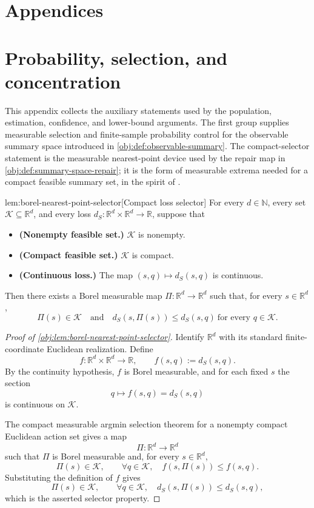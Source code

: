 \documentclass[11pt]{article}
\begin{document}
\appendix

\section*{Appendices}

\section{Probability, selection, and concentration}

This appendix collects the auxiliary statements used by the population, estimation, confidence, and lower-bound arguments. The first group supplies measurable selection and finite-sample probability control for the observable summary space introduced in \cref{obj:def:observable-summary}. The compact-selector statement is the measurable nearest-point device used by the repair map in \cref{obj:def:summary-space-repair}; it is the form of measurable extrema needed for a compact feasible summary set, in the spirit of \citet{BrownPurves1973}.

\begin{lemmav}{lem:borel-nearest-point-selector}[Compact loss selector]
For every \(d\in\mathbb N\), every set \(\mathcal K\subseteq \mathbb R^d\), and every loss \(d_S:\mathbb R^d\times\mathbb R^d\to\mathbb R\), suppose that
\begin{itemize}
\item \textbf{(Nonempty feasible set.)} \(\mathcal K\) is nonempty.
\item \textbf{(Compact feasible set.)} \(\mathcal K\) is compact.
\item \textbf{(Continuous loss.)} The map \((s,q)\mapsto d_S(s,q)\) is continuous.
\end{itemize}
Then there exists a Borel measurable map \(\Pi:\mathbb R^d\to\mathbb R^d\) such that, for every \(s\in\mathbb R^d\),
\[
\Pi(s)\in\mathcal K
\quad\text{and}\quad
d_S(s,\Pi(s))\le d_S(s,q)\ \text{for every }q\in\mathcal K .
\]
\end{lemmav}

\begin{proof}[Proof of \cref{obj:lem:borel-nearest-point-selector}]
Identify \(\mathbb R^d\) with its standard finite-coordinate Euclidean realization.  Define
\[
f:\mathbb R^d\times\mathbb R^d\to\mathbb R,
\qquad
f(s,q):=d_S(s,q).
\]
By the continuity hypothesis, \(f\) is Borel measurable, and for each fixed \(s\) the section
\[
q\longmapsto f(s,q)=d_S(s,q)
\]
is continuous on \(\mathcal K\). %

The compact measurable argmin selection theorem for a nonempty compact Euclidean action set gives a map
\[
\Pi:\mathbb R^d\to\mathbb R^d
\]
such that \(\Pi\) is Borel measurable and, for every \(s\in\mathbb R^d\),
\[
\Pi(s)\in\mathcal K,
\qquad
\forall q\in\mathcal K,\quad f(s,\Pi(s))\le f(s,q).
\]
Substituting the definition of \(f\) gives
\[
\Pi(s)\in\mathcal K,
\qquad
\forall q\in\mathcal K,\quad d_S(s,\Pi(s))\le d_S(s,q),
\]
which is the asserted selector property. %
\end{proof}
\end{document}
